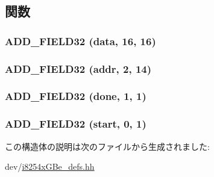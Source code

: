 \subsection{関数}
\hypertarget{structiGbReg_1_1Regs_1_1EERD_ac595d67f8f6504bd50278ecd043e0bd6}{
\subsubsection[{ADD\_\-FIELD32}]{\setlength{\rightskip}{0pt plus 5cm}ADD\_\-FIELD32 (data, \/  16, \/  16)}}
\label{structiGbReg_1_1Regs_1_1EERD_ac595d67f8f6504bd50278ecd043e0bd6}
\hypertarget{structiGbReg_1_1Regs_1_1EERD_ad793234beb15f6253c1f5c2f5091bfee}{
\subsubsection[{ADD\_\-FIELD32}]{\setlength{\rightskip}{0pt plus 5cm}ADD\_\-FIELD32 (addr, \/  2, \/  14)}}
\label{structiGbReg_1_1Regs_1_1EERD_ad793234beb15f6253c1f5c2f5091bfee}
\hypertarget{structiGbReg_1_1Regs_1_1EERD_aad490284e58d3b38a031043748dfdca6}{
\subsubsection[{ADD\_\-FIELD32}]{\setlength{\rightskip}{0pt plus 5cm}ADD\_\-FIELD32 (done, \/  1, \/  1)}}
\label{structiGbReg_1_1Regs_1_1EERD_aad490284e58d3b38a031043748dfdca6}
\hypertarget{structiGbReg_1_1Regs_1_1EERD_ae56b448e0a0d29e270a7662e0eb4e5d8}{
\subsubsection[{ADD\_\-FIELD32}]{\setlength{\rightskip}{0pt plus 5cm}ADD\_\-FIELD32 (start, \/  0, \/  1)}}
\label{structiGbReg_1_1Regs_1_1EERD_ae56b448e0a0d29e270a7662e0eb4e5d8}


この構造体の説明は次のファイルから生成されました:\begin{DoxyCompactItemize}
\item 
dev/\hyperlink{i8254xGBe__defs_8hh}{i8254xGBe\_\-defs.hh}\end{DoxyCompactItemize}
